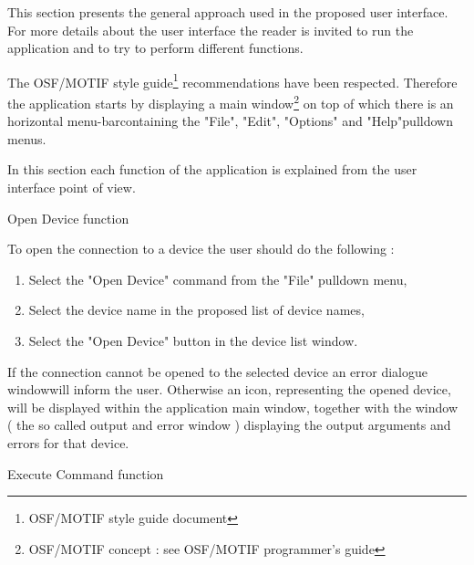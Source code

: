 %
%
%
%
%
%
%
%
%
%
This section presents the general approach used in the proposed user interface.
For more details about the user interface the reader is invited to run the
application and to try to perform different functions. 

The OSF/MOTIF style guide\footnote[1]{OSF/MOTIF style guide document}
recommendations have been respected. Therefore the application starts by
displaying a main window\footnote[2]{OSF/MOTIF concept : see OSF/MOTIF
programmer's guide} on top of which there is an horizontal
menu-bar\footnotemark[2] containing the "File", "Edit", "Options" and
"Help"\footnotemark[1] pulldown menus.

In this section each function of the application is explained from the user
interface point of view.

	{Open Device function}

To open the connection to a device the user should do the following :
\begin{enumerate}
\item
Select the "Open Device" command from the "File" pulldown menu,
\item
Select the device name in the proposed list of device names,
\item
Select the "Open Device" button in the device list window.
\end{enumerate}

If the connection cannot be opened to the selected device an error dialogue
window\footnotemark[2] will inform the user. Otherwise an icon, representing the
opened device, will be displayed within the application main window, together
with the window ( the so called output and error window ) displaying the output
arguments and errors for that device.


	{Execute Command function}

